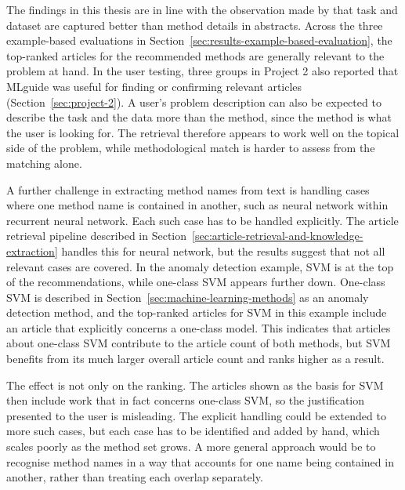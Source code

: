 The findings in this thesis are in line with the observation 
made by \textcite{ostendorff2022_aspect_based_embeddings}
that task and dataset are captured better than method details in abstracts. 
Across the three example-based evaluations in 
Section~\ref{sec:results-example-based-evaluation}, the 
top-ranked articles for the recommended methods are generally 
relevant to the problem at hand. In the user testing, three 
groups in Project 2 also reported that MLguide was useful for 
finding or confirming relevant articles 
(Section~\ref{sec:project-2}). A user's problem description can also
be expected to describe the task and the data more than the method, 
since the method is what the user is looking for. 
The retrieval therefore appears to work well on 
the topical side of the problem, while methodological match 
is harder to assess from the matching alone.

A further challenge in extracting method names from text is handling 
cases where one method name is contained in another, such as neural 
network within recurrent neural network. Each such case has to be 
handled explicitly. The article retrieval pipeline described in 
Section~\ref{sec:article-retrieval-and-knowledge-extraction} handles 
this for neural network, but the results suggest that not all relevant 
cases are covered. In the anomaly detection example, SVM is at the top of the recommendations, while one-class SVM 
appears further down. One-class SVM is described in 
Section~\ref{sec:machine-learning-methods} as an anomaly detection 
method, and the top-ranked articles for SVM in this 
example include an article that explicitly concerns a one-class model. 
This indicates that articles about one-class SVM contribute to the 
article count of both methods, but SVM benefits 
from its much larger overall article count and ranks higher as a 
result.

The effect is not only on the ranking. The articles shown as the basis 
for SVM then include work that in fact concerns 
one-class SVM, so the justification presented to the user is 
misleading. The explicit handling could be extended to more such 
cases, but each case has to be identified and added by hand, which 
scales poorly as the method set grows. A more general approach would 
be to recognise method names in a way that accounts for one name being 
contained in another, rather than treating each overlap separately.

